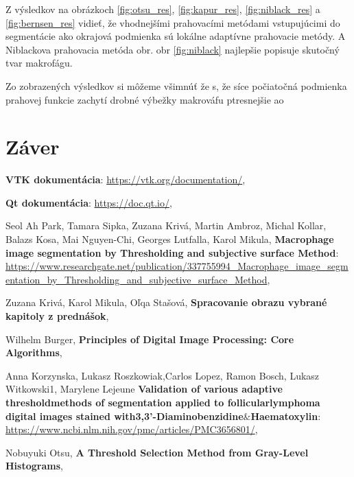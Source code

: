 \documentclass[a4paper,11pt,oneside]{article}%
\begin{document}
Z výsledkov na obrázkoch \ref{fig:otsu_res}, \ref{fig:kapur_res}, \ref{fig:niblack_res} a \ref{fig:bernsen_res}  vidieť, že vhodnejšími prahovacími metódami vstupujúcimi do segmentácie ako okrajová podmienka sú lokálne adaptívne prahovacie metódy. A Niblackova prahovacia metóda obr. obr \ref{fig:niblack} najlepšie popisuje skutočný tvar makrofágu.

Zo zobrazených výsledkov si môžeme všimnúť že s, že síce počiatočná podmienka prahovej funkcie zachytí drobné výbežky makrováfu ptresnejšie ao 

\newpage
\section{Záver}


\newpage
\begin{thebibliography}{50}

\textbf{VTK dokumentácia}:
\url{https://vtk.org/documentation/},

\textbf{Qt dokumentácia}:
\url{https://doc.qt.io/},

Seol Ah Park, Tamara Sipka, Zuzana Krivá, Martin Ambroz, Michal Kollar, Balazs Kosa, Mai Nguyen-Chi, Georges Lutfalla, Karol Mikula, \textbf{Macrophage image segmentation by Thresholding and subjective surface Method}: \\ 
\url{https://www.researchgate.net/publication/337755994_Macrophage_image_segmentation_by_Thresholding_and_subjective_surface_Method},

Zuzana Krivá, Karol Mikula, Oľqa Stašová, \textbf{Spracovanie obrazu vybrané kapitoly z prednášok}, 

Wilhelm Burger, \textbf{Principles of Digital Image Processing: Core Algorithms},

Anna Korzynska, Lukasz Roszkowiak,Carlos Lopez, Ramon Bosch, Lukasz Witkowski1,  Marylene Lejeune \textbf{Validation of various adaptive thresholdmethods of segmentation applied to follicularlymphoma digital images stained with3,3’-Diaminobenzidine$\&$Haematoxylin}: 
\url{https://www.ncbi.nlm.nih.gov/pmc/articles/PMC3656801/},

Nobuyuki Otsu, \textbf{A Threshold Selection Method from Gray-Level Histograms}, 



\end{thebibliography}
\end{document}
